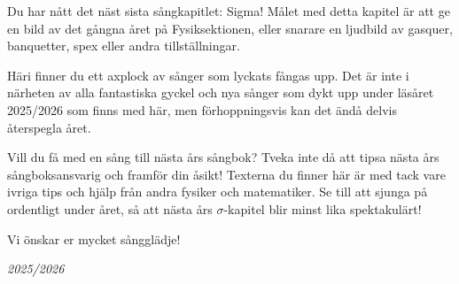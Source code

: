 \documentclass[a6paper, 10pt, twoside]{article}
\begin{document}
\noindent
{}
\small
\vspace{10pt}

\noindent
\small
Du har nått det näst sista sångkapitlet: Sigma! Målet med detta kapitel är att ge en bild av det gångna året på Fysiksektionen, eller snarare en ljudbild av gasquer, banquetter, spex eller andra tillställningar.  

Häri finner du ett axplock av sånger som lyckats fångas upp. Det är inte i närheten av alla fantastiska gyckel och nya sånger som dykt upp under läsåret 2025/2026 som finns med här, men förhoppningsvis kan det ändå delvis återspegla året. 

Vill du få med en sång till nästa års sångbok? Tveka inte då att tipsa nästa års sångboksansvarig och framför din åsikt! Texterna du finner här är med tack vare ivriga tips och hjälp från andra fysiker och matematiker. Se till att sjunga på ordentligt under året, så att nästa års $\sigma$-kapitel blir minst lika spektakulärt!

Vi önskar er mycket sångglädje!


\begin{center}
\huge{\textit{2025/2026}}
\end{center}
\end{document}
